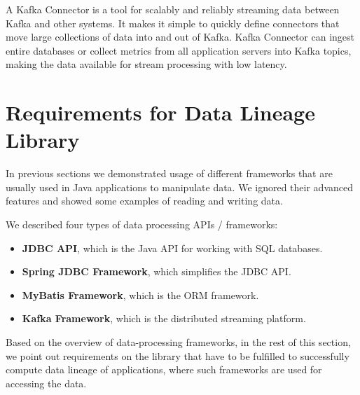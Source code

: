 A Kafka Connector is a tool for scalably and reliably streaming data between Kafka
and other systems. It makes it simple to quickly define connectors that move
large collections of data into and out of Kafka.
Kafka Connector can ingest entire databases or collect metrics from all
application servers into Kafka topics, making the data available
for stream processing with low latency.




\section{Requirements for Data Lineage Library \label{frameworks:requirements}}

In previous sections we demonstrated usage of different frameworks
that are usually used in Java applications to manipulate data.
We ignored their advanced features and showed some examples of reading
and writing data.

We described four types of data processing APIs / frameworks:
\begin{itemize}
  \item \textbf{JDBC API}, which is the Java API for working with SQL databases.
  \item \textbf{Spring JDBC Framework}, which simplifies the JDBC API.
  \item \textbf{MyBatis Framework}, which is the ORM framework.
  \item \textbf{Kafka Framework}, which is the distributed streaming platform.
\end{itemize}

Based on the overview of data-processing frameworks,
in the rest of this section, we point out requirements on the library that
have to be fulfilled to successfully compute data lineage of applications,
where such frameworks are used for accessing the data.

